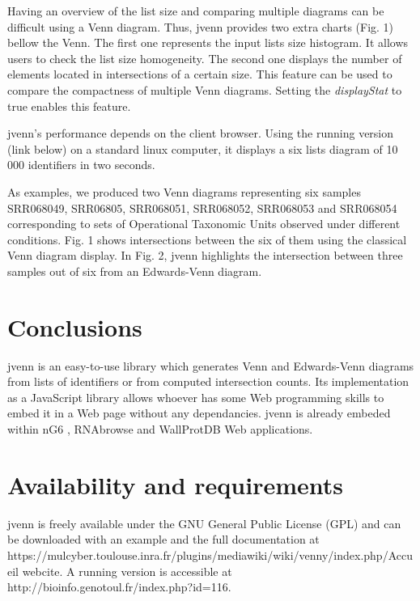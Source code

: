 \documentclass{bmcart}
\begin{document}
Having an overview of the list size and comparing multiple diagrams can be difficult using a Venn diagram. Thus, jvenn provides two extra charts (Fig. 1) 
bellow the Venn. The first one represents the input lists size histogram. It allows users to check the list size homogeneity. The second one displays 
the number of elements located in intersections of a certain size. This feature can be used to compare the compactness of multiple Venn diagrams. 
Setting the \textit{displayStat} to true enables this feature.

jvenn's performance depends on the client browser. Using the running version (link below) on a standard linux computer, it displays a six lists diagram of 
10 000 identifiers in two seconds.

As examples, we produced two Venn diagrams representing six samples SRR068049, SRR06805, SRR068051, SRR068052, SRR068053 and 
SRR068054 corresponding to sets of Operational Taxonomic Units observed under different conditions. Fig. 1 shows intersections
between the six of them using the classical Venn diagram display. In Fig. 2, jvenn highlights the intersection between three samples out of 
six from an Edwards-Venn diagram.


\section*{Conclusions}

jvenn is an easy-to-use library which generates Venn and Edwards-Venn diagrams from lists of identifiers or from
computed intersection counts. Its implementation as a JavaScript library allows whoever has some Web programming skills to embed it 
in a Web page without any dependancies. jvenn is already embeded within nG6 \cite{Mariette2012}, RNAbrowse \cite{Mariette} and 
WallProtDB \cite{SanClemente} Web applications.

\section*{Availability and requirements}

jvenn is freely available under the GNU General Public License (GPL) and can be downloaded with an example and the full documentation
at https://mulcyber.toulouse.inra.fr/plugins/mediawiki/wiki/venny/index.php/Accueil webcite. A running version is accessible at 
http://bioinfo.genotoul.fr/index.php?id=116.

\end{document}
